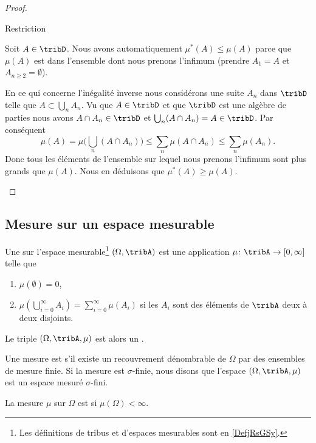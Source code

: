 \begin{proof}
\begin{subproof}
    \item[Restriction]

        Soit \( A\in\tribD\). Nous avons automatiquement \( \mu^*(A)\leq \mu(A)\) parce que \( \mu(A)\) est dans l'ensemble dont nous prenons l'infimum (prendre \( A_1=A\) et \( A_{n\geq 2}=\emptyset\)).

        En ce qui concerne l'inégalité inverse nous considérons une suite \( A_n\) dans \( \tribD\) telle que \( A\subset\bigcup_nA_n\). Vu que \( A\in\tribD\) et que \( \tribD\) est une algèbre de parties nous avons \( A\cap A_n\in \tribD\) et \( \bigcup_n(A\cap A_n)=A\in\tribD\). Par conséquent
        \begin{equation}
            \mu(A)=\mu\big( \bigcup_n(A\cap A_n) \big)\leq \sum_n\mu(A\cap A_n)\leq \sum_n\mu(A_n).
        \end{equation}
        Donc tous les éléments de l'ensemble sur lequel nous prenons l'infimum sont plus grands que \( \mu(A)\). Nous en déduisons que \( \mu^*(A)\geq \mu(A)\).
    \end{subproof}
\end{proof}

\subsection{Mesure sur un espace mesurable}

\begin{definition}  \label{DefBTsgznn}
    Une  sur l'espace mesurable\footnote{Les définitions de tribus et d'espaces mesurables sont en \ref{DefjRsGSy}.} \( (\Omega,\tribA)\) est une application \( \mu\colon \tribA\to \mathopen[ 0 , \infty \mathclose]\) telle que
    \begin{enumerate}
        \item
            \( \mu(\emptyset)=0\),
        \item   \label{ItemQFjtOjXiii}
            \( \mu\left( \bigcup_{i=0}^{\infty}A_i\right)=\sum_{i=0}^{\infty}\mu(A_i)\) si les \( A_i\) sont des éléments de \( \tribA\) deux à deux disjoints.
    \end{enumerate}
            Le triple \( (\Omega,\tribA,\mu)\) est alors un .

    Une mesure est  s'il existe un recouvrement dénombrable de \( \Omega\) par des ensembles de mesure finie. Si la mesure est $\sigma$-finie, nous disons que l'espace \( (\Omega,\tribA,\mu)\) est un espace mesuré $\sigma$-fini.

    La mesure \( \mu\) sur \( \Omega\) est  si \( \mu(\Omega)<\infty\).
\end{definition}

